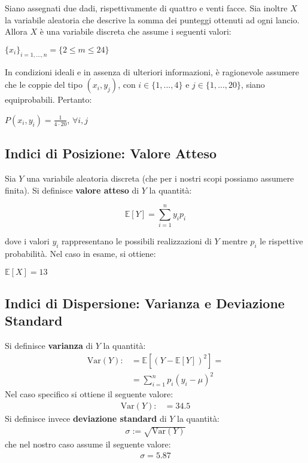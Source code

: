 Siano assegnati due dadi, rispettivamente di quattro e venti facce. Sia inoltre $X$ la variabile aleatoria che descrive la somma dei punteggi ottenuti ad ogni lancio. Allora $X$ è una variabile discreta che assume i seguenti valori:
\begin{center}
    $\{x_i\}_{i=1,...,n} = \{2 \leq m \leq 24\}$
\end{center}
In condizioni ideali e in assenza di ulteriori informazioni, è ragionevole assumere che le coppie del tipo $(x_i, y_j)$, con $i \in \{1,...,4\}$ e $j \in \{1,...,20\}$, siano equiprobabili. Pertanto:
\begin{center}
    $P(x_i, y_i) = \frac{1}{4 \cdot 20}$, $\forall i, j$
\end{center}




\subsection{Indici di Posizione: Valore Atteso}
Sia $Y$ una variabile aleatoria discreta (che per i nostri scopi possiamo assumere finita). Si definisce \textbf{valore atteso} di $Y$ la quantità:
\begin{center}
    \[\mathbb{E}[Y] = \sum_{i=1}^{n} y_i p_i\]
\end{center}
dove i valori $y_i$ rappresentano le possibili realizzazioni di $Y$ mentre $p_i$ le rispettive probabilità. Nel caso in esame, si ottiene:
\begin{center}
    $\mathbb{E}[X] = 13$
\end{center}
\subsection{Indici di Dispersione: Varianza e Deviazione Standard}
Si definisce \textbf{varianza} di $Y$ la quantità:
\begin{align*}
    \mathrm{Var}(Y) :&= \mathbb{E}[(Y-\mathbb{E}[Y])^2]= \\
    &= \sum_{i=1}^{n}p_i(y_i - \mu)^2
\end{align*}
Nel caso specifico si ottiene il seguente valore:
\begin{align*}
    \mathrm{Var}(Y) :&= 34.5
\end{align*}
Si definisce invece \textbf{deviazione standard} di $Y$ la quantità:
\begin{align*}
    \sigma := \sqrt{\text{Var}(Y)}
\end{align*}
che nel nostro caso assume il seguente valore:
\begin{align*}
    \sigma = 5.87
\end{align*}

